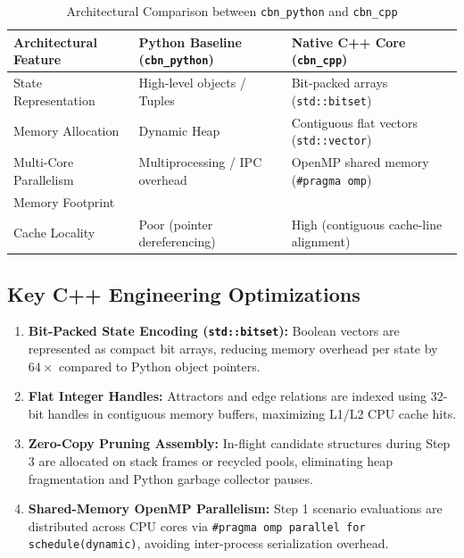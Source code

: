 \documentclass{svproc}
\begin{document}
\begin{table}[h]
\centering
\caption{Architectural Comparison between \texttt{cbn\_python} and \texttt{cbn\_cpp}}
\label{tab:architecture_comparison}
\begin{tabular}{lll}
\toprule
\textbf{Architectural Feature} & \textbf{Python Baseline (\texttt{cbn\_python})} & \textbf{Native C++ Core (\texttt{cbn\_cpp})} \\
\midrule
State Representation & High-level objects / Tuples & Bit-packed arrays (\texttt{std::bitset}) \\
Memory Allocation & Dynamic Heap & Contiguous flat vectors (\texttt{std::vector}) \\
Multi-Core Parallelism & Multiprocessing / IPC overhead & OpenMP shared memory (\texttt{\#pragma omp}) \\
Memory Footprint & & \\
Cache Locality & Poor (pointer dereferencing) & High (contiguous cache-line alignment) \\
\bottomrule
\end{tabular}
\end{table}

\subsection{Key C++ Engineering Optimizations}
\begin{enumerate}
    \item \textbf{Bit-Packed State Encoding (\texttt{std::bitset}):} Boolean vectors are represented as compact bit arrays, reducing memory overhead per state by $64\times$ compared to Python object pointers.
    \item \textbf{Flat Integer Handles:} Attractors and edge relations are indexed using 32-bit handles in contiguous memory buffers, maximizing L1/L2 CPU cache hits.
    \item \textbf{Zero-Copy Pruning Assembly:} In-flight candidate structures during Step 3 are allocated on stack frames or recycled pools, eliminating heap fragmentation and Python garbage collector pauses.
    \item \textbf{Shared-Memory OpenMP Parallelism:} Step 1 scenario evaluations are distributed across CPU cores via \texttt{\#pragma omp parallel for schedule(dynamic)}, avoiding inter-process serialization overhead.
\end{enumerate}
\end{document}
